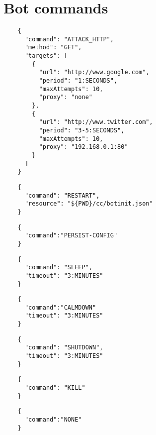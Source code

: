 \section{Bot commands}
\label{sec:bot-commands}

\lipsum[1]

\begin{description}
  \setlength\itemsep{1em}

  \item[ATTACK-HTTP] \lipsum[1]
  \begin{verbatim}
    {
      "command": "ATTACK_HTTP",
      "method": "GET",
      "targets": [
        {
          "url": "http://www.google.com",
          "period": "1:SECONDS",
          "maxAttempts": 10,
          "proxy": "none"
        },
        {
          "url": "http://www.twitter.com",
          "period": "3-5:SECONDS",
          "maxAttempts": 10,
          "proxy": "192.168.0.1:80"
        }
      ]
    }
  \end{verbatim}

  \item[RESTART] \lipsum[1]
  \begin{verbatim}
    {
      "command": "RESTART",
      "resource": "${PWD}/cc/botinit.json"
    }
  \end{verbatim}

  \item[PERSIST-CONFIG] \lipsum[1]
  \begin{verbatim}
    {
      "command":"PERSIST-CONFIG"
    }
  \end{verbatim}

  \item[SLEEP] \lipsum[1]
  \begin{verbatim}
    {
      "command": "SLEEP",
      "timeout": "3:MINUTES"
    }
  \end{verbatim}

  \item[CALMDOWN] \lipsum[1]
  \begin{verbatim}
    {
      "command":"CALMDOWN"
      "timeout": "3:MINUTES"
    }
  \end{verbatim}

  \item[SHUTDOWN] \lipsum[1]
  \begin{verbatim}
    {
      "command": "SHUTDOWN",
      "timeout": "3:MINUTES"
    }
  \end{verbatim}

  \item[KILL] \lipsum[1]
  \begin{verbatim}
    {
      "command": "KILL"
    }
  \end{verbatim}

  \item[NONE] \lipsum[1]
  \begin{verbatim}
    {
      "command":"NONE"
    }
  \end{verbatim}

\end{description}

\lipsum[1]
